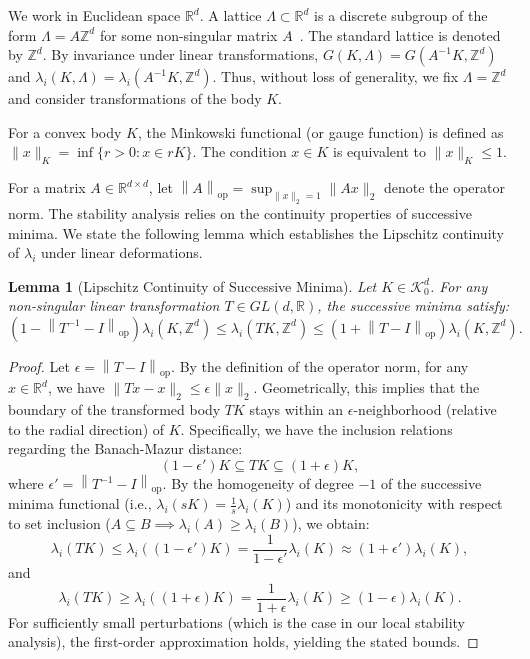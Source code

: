 \documentclass[11pt, reqno]{amsart}
\newtheorem{lemma}[theorem]{Lemma}
\theoremstyle{definition}
\newcommand{\R}{\mathbb{R}}
\newcommand{\Z}{\mathbb{Z}}
\newcommand{\K}{\mathcal{K}}
\newcommand{\opnorm}[1]{\left\| #1 \right\|_{\mathrm{op}}} %
\begin{document}
We work in Euclidean space $\R^d$.
A lattice $\Lambda \subset \R^d$ is a discrete subgroup of the form $\Lambda = A\Z^d$ for some non-singular matrix $A$~\cite{henk2002successive}.
The standard lattice is denoted by $\Z^d$.
By invariance under linear transformations, $G(K, \Lambda) = G(A^{-1}K, \Z^d)$ and $\lambda_i(K, \Lambda) = \lambda_i(A^{-1}K, \Z^d)$. Thus, without loss of generality, we fix $\Lambda = \Z^d$ and consider transformations of the body $K$.

For a convex body $K$, the Minkowski functional (or gauge function) is defined as $\|x\|_K = \inf \{ r > 0 : x \in rK \}$. The condition $x \in K$ is equivalent to $\|x\|_K \le 1$.


For a matrix $A \in \R^{d \times d}$, let $\opnorm{A} = \sup_{\|x\|_2=1} \|Ax\|_2$ denote the operator norm. The stability analysis relies on the continuity properties of successive minima. We state the following lemma which establishes the Lipschitz continuity of $\lambda_i$ under linear deformations.

\begin{lemma}[Lipschitz Continuity of Successive Minima] \label{lem:lipschitz}
Let $K \in \K^d_0$. For any non-singular linear transformation $T \in GL(d, \R)$, the successive minima satisfy:
\begin{equation}
    (1 - \opnorm{T^{-1}-I}) \lambda_i(K, \Z^d) \le \lambda_i(TK, \Z^d) \le (1 + \opnorm{T-I}) \lambda_i(K, \Z^d).
\end{equation}
\end{lemma}

\begin{proof}
Let $\epsilon = \opnorm{T-I}$. By the definition of the operator norm, for any $x \in \R^d$, we have $\|Tx - x\|_2 \le \epsilon \|x\|_2$.
Geometrically, this implies that the boundary of the transformed body $TK$ stays within an $\epsilon$-neighborhood (relative to the radial direction) of $K$.
Specifically, we have the inclusion relations regarding the Banach-Mazur distance:
\[ (1-\epsilon')K \subseteq TK \subseteq (1+\epsilon)K, \]
where $\epsilon' = \opnorm{T^{-1}-I}$.
By the homogeneity of degree $-1$ of the successive minima functional (i.e., $\lambda_i(sK) = \frac{1}{s}\lambda_i(K)$) and its monotonicity with respect to set inclusion ($A \subseteq B \implies \lambda_i(A) \ge \lambda_i(B)$), we obtain:
\[ \lambda_i(TK) \le \lambda_i((1-\epsilon')K) = \frac{1}{1-\epsilon'}\lambda_i(K) \approx (1+\epsilon')\lambda_i(K), \]
and
\[ \lambda_i(TK) \ge \lambda_i((1+\epsilon)K) = \frac{1}{1+\epsilon}\lambda_i(K) \ge (1-\epsilon)\lambda_i(K). \]
For sufficiently small perturbations (which is the case in our local stability analysis), the first-order approximation holds, yielding the stated bounds.
\end{proof}
\end{document}
